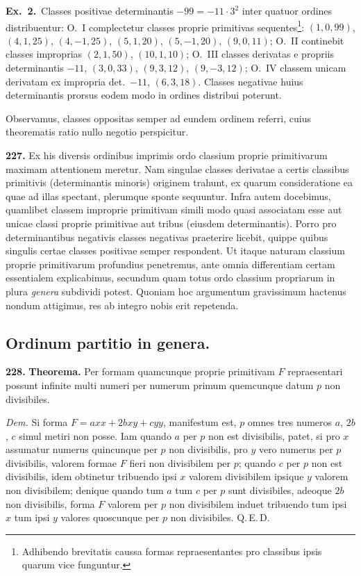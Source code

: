 \documentclass[12pt,a4paper]{article}
\theoremstyle{plain}
\theoremstyle{definition}
\theoremstyle{remark}
\begin{document}
\textbf{Ex.\ 2.}\ Classes positivae determinantis $-99=-11\cdot 3^2$ inter quatuor ordines distribuentur: O.\ I complectetur classes proprie primitivas sequentes\footnote{Adhibendo brevitatis caussa formas repraesentantes pro classibus ipsis quarum vice funguntur.}: $(1,0,99)$, $(4,1,25)$, $(4,-1,25)$, $(5,1,20)$, $(5,-1,20)$, $(9,0,11)$; O.\ II continebit classes improprias $(2,1,50)$, $(10,1,10)$; O.\ III classes derivatas e propriis determinantis $-11$, $(3,0,33)$, $(9,3,12)$, $(9,-3,12)$; O.\ IV classem unicam derivatam ex impropria det.\ $-11$, $(6,3,18)$. Classes negativae huius determinantis prorsus eodem modo in ordines distribui poterunt.

Observamus, classes oppositas semper ad eundem ordinem referri, cuius theorematis ratio nullo negotio perspicitur.

\textbf{227.}
Ex his diversis ordinibus imprimis ordo classium proprie primitivarum maximam attentionem meretur. Nam singulae classes derivatae a certis classibus primitivis (determinantis minoris) originem trahunt, ex quarum consideratione ea quae ad illas spectant, plerumque sponte sequuntur. Infra autem docebimus, quamlibet classem improprie primitivam simili modo quasi associatam esse aut unicae classi proprie primitivae aut tribus (eiusdem determinantis). Porro pro determinantibus negativis classes negativas praeterire licebit, quippe quibus singulis certae classes positivae semper respondent. Ut itaque naturam classium proprie primitivarum profundius penetremus, ante omnia differentiam certam essentialem explicabimus, secundum quam totus ordo classium propriarum in plura \emph{genera} subdividi potest. Quoniam hoc argumentum gravissimum hactenus nondum attigimus, res ab integro nobis erit repetenda.


\subsection*{Ordinum partitio in genera.}

\textbf{228.}
\textbf{Theorema.}
Per formam quamcunque proprie primitivam $F$ repraesentari possunt infinite multi numeri per numerum primum quemcunque datum $p$ non divisibiles.

\textit{Dem.}
Si forma $F=axx+2bxy+cyy$, manifestum est, $p$ omnes tres numeros $a$, $2b$, $c$ simul metiri non posse. Iam quando $a$ per $p$ non est divisibilis, patet, si pro $x$ assumatur numerus quincunque per $p$ non divisibilis, pro $y$ vero numerus per $p$ divisibilis, valorem formae $F$ fieri non divisibilem per $p$; quando $c$ per $p$ non est divisibilis, idem obtinetur tribuendo ipsi $x$ valorem divisibilem ipsique $y$ valorem non divisibilem; denique quando tum $a$ tum $c$ per $p$ sunt divisibiles, adeoque $2b$ non divisibilis, forma $F$ valorem per $p$ non divisibilem induet tribuendo tum ipsi $x$ tum ipsi $y$ valores quoscunque per $p$ non divisibiles. Q.\,E.\,D.
\end{document}
